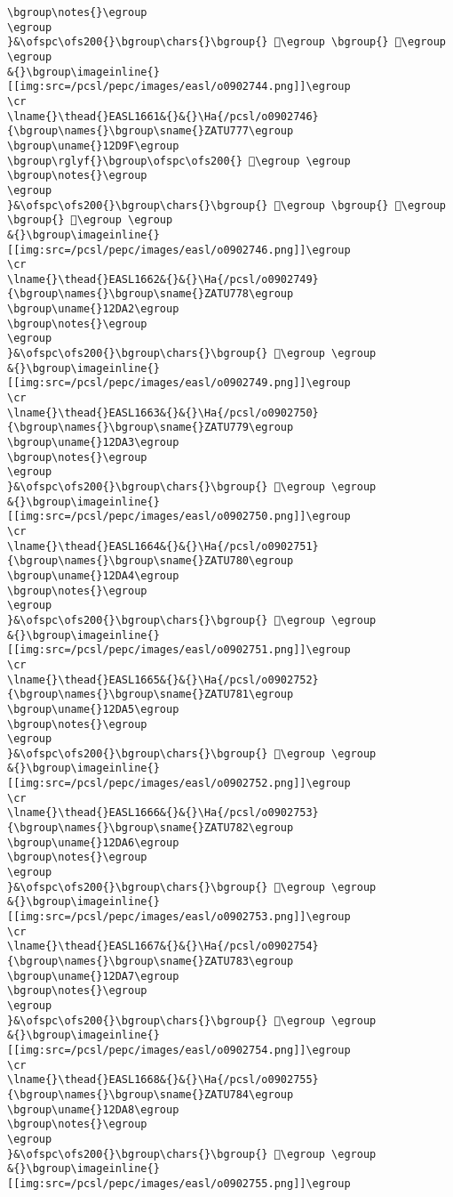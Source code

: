 \begin{verbatim}
\bgroup\notes{}\egroup
\egroup
}&\ofspc\ofs200{}\bgroup\chars{}\bgroup{} 𒶞\egroup \bgroup{} 𒶝\egroup \egroup
&{}\bgroup\imageinline{}[[img:src=/pcsl/pepc/images/easl/o0902744.png]]\egroup
\cr
\lname{}\thead{}EASL1661&{}&{}\Ha{/pcsl/o0902746}{\bgroup\names{}\bgroup\sname{}ZATU777\egroup
\bgroup\uname{}12D9F\egroup
\bgroup\rglyf{}\bgroup\ofspc\ofs200{} 𒶟\egroup \egroup
\bgroup\notes{}\egroup
\egroup
}&\ofspc\ofs200{}\bgroup\chars{}\bgroup{} 𒶟\egroup \bgroup{} 𒶠\egroup \bgroup{} 𒶡\egroup \egroup
&{}\bgroup\imageinline{}[[img:src=/pcsl/pepc/images/easl/o0902746.png]]\egroup
\cr
\lname{}\thead{}EASL1662&{}&{}\Ha{/pcsl/o0902749}{\bgroup\names{}\bgroup\sname{}ZATU778\egroup
\bgroup\uname{}12DA2\egroup
\bgroup\notes{}\egroup
\egroup
}&\ofspc\ofs200{}\bgroup\chars{}\bgroup{} 𒶢\egroup \egroup
&{}\bgroup\imageinline{}[[img:src=/pcsl/pepc/images/easl/o0902749.png]]\egroup
\cr
\lname{}\thead{}EASL1663&{}&{}\Ha{/pcsl/o0902750}{\bgroup\names{}\bgroup\sname{}ZATU779\egroup
\bgroup\uname{}12DA3\egroup
\bgroup\notes{}\egroup
\egroup
}&\ofspc\ofs200{}\bgroup\chars{}\bgroup{} 𒶣\egroup \egroup
&{}\bgroup\imageinline{}[[img:src=/pcsl/pepc/images/easl/o0902750.png]]\egroup
\cr
\lname{}\thead{}EASL1664&{}&{}\Ha{/pcsl/o0902751}{\bgroup\names{}\bgroup\sname{}ZATU780\egroup
\bgroup\uname{}12DA4\egroup
\bgroup\notes{}\egroup
\egroup
}&\ofspc\ofs200{}\bgroup\chars{}\bgroup{} 𒶤\egroup \egroup
&{}\bgroup\imageinline{}[[img:src=/pcsl/pepc/images/easl/o0902751.png]]\egroup
\cr
\lname{}\thead{}EASL1665&{}&{}\Ha{/pcsl/o0902752}{\bgroup\names{}\bgroup\sname{}ZATU781\egroup
\bgroup\uname{}12DA5\egroup
\bgroup\notes{}\egroup
\egroup
}&\ofspc\ofs200{}\bgroup\chars{}\bgroup{} 𒶥\egroup \egroup
&{}\bgroup\imageinline{}[[img:src=/pcsl/pepc/images/easl/o0902752.png]]\egroup
\cr
\lname{}\thead{}EASL1666&{}&{}\Ha{/pcsl/o0902753}{\bgroup\names{}\bgroup\sname{}ZATU782\egroup
\bgroup\uname{}12DA6\egroup
\bgroup\notes{}\egroup
\egroup
}&\ofspc\ofs200{}\bgroup\chars{}\bgroup{} 𒶦\egroup \egroup
&{}\bgroup\imageinline{}[[img:src=/pcsl/pepc/images/easl/o0902753.png]]\egroup
\cr
\lname{}\thead{}EASL1667&{}&{}\Ha{/pcsl/o0902754}{\bgroup\names{}\bgroup\sname{}ZATU783\egroup
\bgroup\uname{}12DA7\egroup
\bgroup\notes{}\egroup
\egroup
}&\ofspc\ofs200{}\bgroup\chars{}\bgroup{} 𒶧\egroup \egroup
&{}\bgroup\imageinline{}[[img:src=/pcsl/pepc/images/easl/o0902754.png]]\egroup
\cr
\lname{}\thead{}EASL1668&{}&{}\Ha{/pcsl/o0902755}{\bgroup\names{}\bgroup\sname{}ZATU784\egroup
\bgroup\uname{}12DA8\egroup
\bgroup\notes{}\egroup
\egroup
}&\ofspc\ofs200{}\bgroup\chars{}\bgroup{} 𒶨\egroup \egroup
&{}\bgroup\imageinline{}[[img:src=/pcsl/pepc/images/easl/o0902755.png]]\egroup

\end{verbatim}
